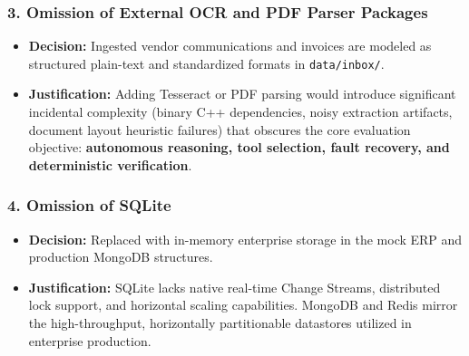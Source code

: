\subsubsection{3. Omission of External OCR and PDF Parser Packages}
\begin{itemize}[leftmargin=*]
  \item \textbf{Decision:} Ingested vendor communications and invoices are modeled as structured plain-text and standardized formats in \texttt{data/inbox/}.
  \item \textbf{Justification:} Adding Tesseract or PDF parsing would introduce significant incidental complexity (binary C++ dependencies, noisy extraction artifacts, document layout heuristic failures) that obscures the core evaluation objective: \textbf{autonomous reasoning, tool selection, fault recovery, and deterministic verification}.
\end{itemize}

\subsubsection{4. Omission of SQLite}
\begin{itemize}[leftmargin=*]
  \item \textbf{Decision:} Replaced with in-memory enterprise storage in the mock ERP and production MongoDB structures.
  \item \textbf{Justification:} SQLite lacks native real-time Change Streams, distributed lock support, and horizontal scaling capabilities. MongoDB and Redis mirror the high-throughput, horizontally partitionable datastores utilized in enterprise production.
\end{itemize}

